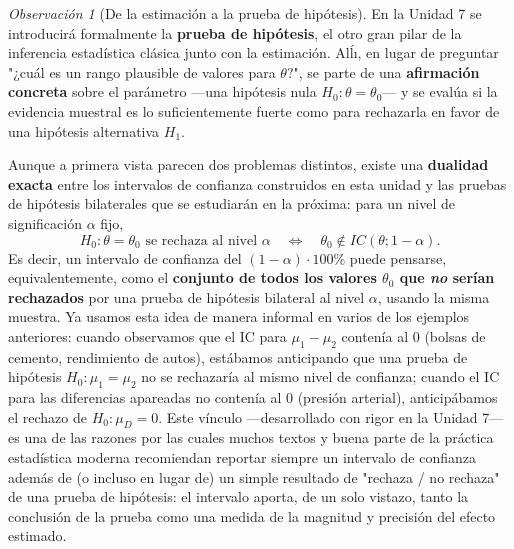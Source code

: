\documentclass[11pt,a4paper]{article}
\theoremstyle{plain}
\theoremstyle{definition}
\theoremstyle{remark}
\newtheorem{observacion}[teorema]{Observación}
\begin{document}
\begin{observacion}[De la estimación a la prueba de hipótesis]
En la Unidad 7 se introducirá formalmente la \textbf{prueba de hipótesis}, el otro gran pilar de la inferencia estadística clásica junto con la estimación. Alĺı, en lugar de preguntar "¿cuál es un rango plausible de valores para $\theta$?", se parte de una \textbf{afirmación concreta} sobre el parámetro —una hipótesis nula $H_0:\theta=\theta_0$— y se evalúa si la evidencia muestral es lo suficientemente fuerte como para rechazarla en favor de una hipótesis alternativa $H_1$.

Aunque a primera vista parecen dos problemas distintos, existe una \textbf{dualidad exacta} entre los intervalos de confianza construidos en esta unidad y las pruebas de hipótesis bilaterales que se estudiarán en la próxima: para un nivel de significación $\alpha$ fijo,
\[
H_0:\theta=\theta_0 \text{ se rechaza al nivel } \alpha \quad\Longleftrightarrow\quad \theta_0 \notin IC(\theta;1-\alpha).
\]
Es decir, un intervalo de confianza del $(1-\alpha)\cdot 100\%$ puede pensarse, equivalentemente, como el \textbf{conjunto de todos los valores $\theta_0$ que \emph{no} serían rechazados} por una prueba de hipótesis bilateral al nivel $\alpha$, usando la misma muestra. Ya usamos esta idea de manera informal en varios de los ejemplos anteriores: cuando observamos que el IC para $\mu_1-\mu_2$ contenía al $0$ (bolsas de cemento, rendimiento de autos), estábamos anticipando que una prueba de hipótesis $H_0:\mu_1=\mu_2$ no se rechazaría al mismo nivel de confianza; cuando el IC para las diferencias apareadas no contenía al $0$ (presión arterial), anticipábamos el rechazo de $H_0:\mu_D=0$. Este vínculo —desarrollado con rigor en la Unidad 7— es una de las razones por las cuales muchos textos y buena parte de la práctica estadística moderna recomiendan reportar siempre un intervalo de confianza además de (o incluso en lugar de) un simple resultado de "rechaza / no rechaza" de una prueba de hipótesis: el intervalo aporta, de un solo vistazo, tanto la conclusión de la prueba como una medida de la magnitud y precisión del efecto estimado.
\end{observacion}
\end{document}
